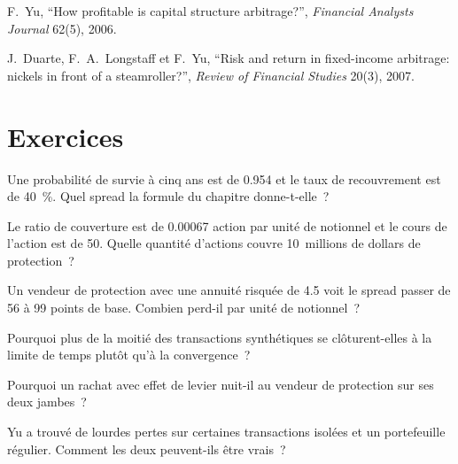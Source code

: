 \begin{omsources}
\item F.~Yu, ``How profitable is capital structure arbitrage?'', \emph{Financial Analysts Journal} 62(5), 2006.
\item J.~Duarte, F.~A.~Longstaff et F.~Yu, ``Risk and return in fixed-income arbitrage: nickels in front of a steamroller?'', \emph{Review of
Financial Studies} 20(3), 2007.
\end{omsources}

\section{Exercices}

\begin{exercise}[$\star$]\label{exo:s2:capital-structure-arbitrage:1}
Une probabilité de survie à cinq ans est de 0.954 et le taux de recouvrement est de 40~\%. Quel spread la formule du chapitre donne-t-elle~?
\end{exercise}

\begin{exercise}[$\star$]\label{exo:s2:capital-structure-arbitrage:2}
Le ratio de couverture est de 0.00067 action par unité de notionnel et le cours de l'action est de 50. Quelle quantité d'actions couvre 10~millions de dollars de protection~?
\end{exercise}

\begin{exercise}[$\star$]\label{exo:s2:capital-structure-arbitrage:3}
Un vendeur de protection avec une annuité risquée de 4.5 voit le spread passer de 56 à 99 points de base. Combien perd-il par unité de notionnel~?
\end{exercise}

\begin{exercise}[$\star\star$]\label{exo:s2:capital-structure-arbitrage:4}
Pourquoi plus de la moitié des transactions synthétiques se clôturent-elles à la limite de temps plutôt qu'à la convergence~?
\end{exercise}

\begin{exercise}[$\star\star$]\label{exo:s2:capital-structure-arbitrage:5}
Pourquoi un rachat avec effet de levier nuit-il au vendeur de protection sur ses deux jambes~?
\end{exercise}

\begin{exercise}[$\star\star$]\label{exo:s2:capital-structure-arbitrage:6}
Yu a trouvé de lourdes pertes sur certaines transactions isolées et un portefeuille régulier. Comment les deux peuvent-ils être vrais~?
\end{exercise}

